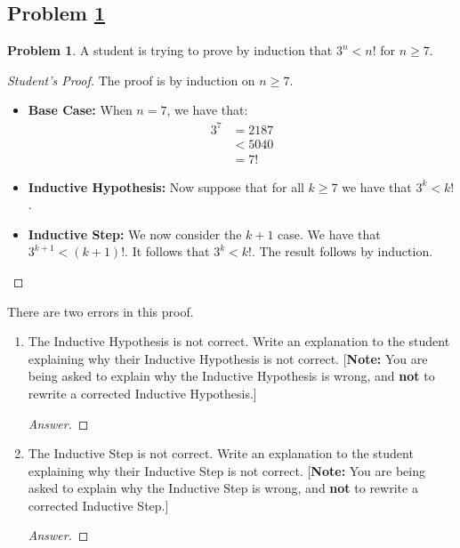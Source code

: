 \documentclass[11pt]{article}
\theoremstyle{definition}
\theoremstyle{definition}
\newtheorem{required}{Problem}
\theoremstyle{definition}
\begin{document}
\subsection{Problem \ref{Induction1}}
\begin{required} \label{Induction1}
A student is trying to prove by induction that $3^{n} < n!$ for $n \geq 7$. 

\begin{proof}[Student's Proof]
The proof is by induction on $n \geq 7$. 
\begin{itemize}
\item \textbf{Base Case:} When $n = 7$, we have that:
\begin{align*}
3^{7} &= 2187 \\
&< 5040 \\
&= 7!
\end{align*}

\item \textbf{Inductive Hypothesis:} Now suppose that for all $k \geq 7$ we have that $3^{k} < k!$. 

\item \textbf{Inductive Step:} We now consider the $k+1$ case. We have that $3^{k+1} < (k+1)!$. It follows that $3^{k} < k!$. The result follows by induction.
\end{itemize}
\end{proof}

There are two errors in this proof. 
\begin{enumerate}[label=(\alph*)]
\item The Inductive Hypothesis is not correct. Write an explanation to the student explaining why their Inductive Hypothesis is not correct.  [\textbf{Note:} You are being asked to explain why the Inductive Hypothesis is wrong, and \textbf{not} to rewrite a corrected Inductive Hypothesis.]


\begin{proof}[Answer]
\end{proof}



\vskip 15pt
\item The Inductive Step is not correct. Write an explanation to the student explaining why their Inductive Step is not correct. [\textbf{Note:} You are being asked to explain why the Inductive Step is wrong, and \textbf{not} to rewrite a corrected Inductive Step.]

\begin{proof}[Answer]
\end{proof}
\end{enumerate}
\end{required}
\end{document}
